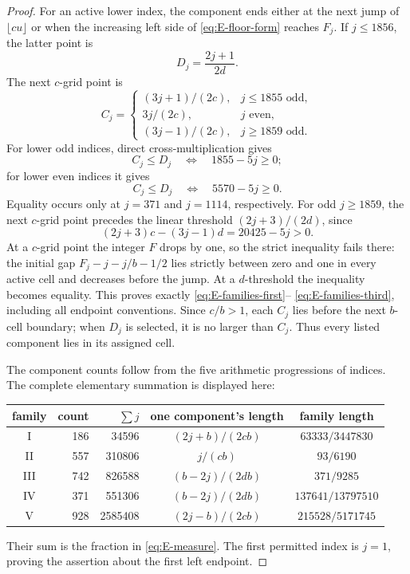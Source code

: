 \documentclass[11pt,reqno,letterpaper]{amsart}
\numberwithin{equation}{section}
\theoremstyle{definition}
\theoremstyle{remark}
\begin{document}
\begin{proof}
For an active lower index, the component ends either at the next jump of
\(\lfloor cu\rfloor\) or when the increasing left side of
\eqref{eq:E-floor-form} reaches \(F_j\).  If \(j\leq1856\), the latter
point is
\begin{equation}\label{eq:d-threshold}
 D_j=\frac{2j+1}{2d}.
\end{equation}
The next \(c\)-grid point is
\begin{equation}\label{eq:c-thresholds}
 C_j=\begin{cases}
  (3j+1)/(2c),&j\leq1855\text{ odd},\\
  3j/(2c),&j\text{ even},\\
  (3j-1)/(2c),&j\geq1859\text{ odd}.
 \end{cases}
\end{equation}
For lower odd indices, direct cross-multiplication gives
\[
 C_j\leq D_j\quad\Longleftrightarrow\quad1855-5j\geq0;
\]
for lower even indices it gives
\[
 C_j\leq D_j\quad\Longleftrightarrow\quad5570-5j\geq0.
\]
Equality occurs only at \(j=371\) and \(j=1114\), respectively.  For
odd \(j\geq1859\), the next \(c\)-grid point precedes the linear
threshold \((2j+3)/(2d)\), since
\[
 (2j+3)c-(3j-1)d=20425-5j>0.
\]
At a \(c\)-grid point the integer \(F\) drops by one, so the strict
inequality fails there: the initial gap \(F_j-j-j/b-1/2\) lies strictly
between zero and one in every active cell and decreases before the jump.
At a \(d\)-threshold the inequality becomes equality.  This proves
exactly \eqref{eq:E-families-first}--
\eqref{eq:E-families-third}, including all endpoint conventions.
Since \(c/b>1\), each \(C_j\) lies before the next \(b\)-cell boundary;
when \(D_j\) is selected, it is no larger than \(C_j\).  Thus every
listed component lies in its assigned cell.

The component counts follow from the five arithmetic progressions of
indices.  The complete elementary summation is displayed here:
\begin{center}
\small
\begin{tabular}{crrcc}
\toprule
family & count & \(\sum j\) & one component's length & family length\\
\midrule
I   &186&34596  &\((2j+b)/(2cb)\)&\(63333/3447830\)\\
II  &557&310806 &\(j/(cb)\)&\(93/6190\)\\
III &742&826588 &\((b-2j)/(2db)\)&\(371/9285\)\\
IV  &371&551306 &\((b-2j)/(2db)\)&\(137641/13797510\)\\
V   &928&2585408&\((2j-b)/(2cb)\)&\(215528/5171745\)\\
\bottomrule
\end{tabular}
\end{center}
Their sum is the fraction in \eqref{eq:E-measure}.  The first permitted
index is \(j=1\), proving the assertion about the first left endpoint.
\end{proof}
\end{document}
